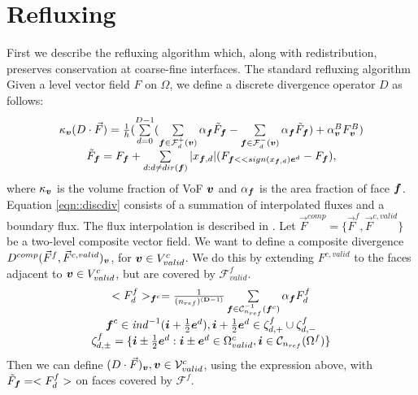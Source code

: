 \section{Refluxing}
\label{sec::reflux}
First we describe the refluxing algorithm which, along with
redistribution, preserves conservation at coarse-fine interfaces.
The standard refluxing algorithm
Given a level vector field $F$ on $\Omega$, we define a discrete
divergence operator $D$ as follows:
\begin{equation}
\begin{array}{c}
\kappa_{\boldsymbol{v}}(D \cdot \vec{F}) = \frac{1}{h}(
\sum\limits^{D-1}_{d=0} (
\sum\limits_{{\boldsymbol{f}} \in {\cal F}^+_d({\boldsymbol{v}})} \alpha_{\boldsymbol{f}} \tilde{F}_{\boldsymbol{f}}-
\sum\limits_{{\boldsymbol{f}} \in {\cal F}^-_d({\boldsymbol{v}})} \alpha_{\boldsymbol{f}} \tilde{F}_{\boldsymbol{f}})
 + \alpha^B_{\boldsymbol{v}} F^B_{\boldsymbol{v}}) \\ 
\tilde{F}_{\boldsymbol{f}} = F_{\boldsymbol{f}} + \sum\limits_{d:d \neq dir({\boldsymbol{f}})}|x_{{\boldsymbol{f}},
d}|(F_{{\boldsymbol{f}}<<sign(x_{{\boldsymbol{f}}, d}){\boldsymbol{e}}^d}-F_{\boldsymbol{f}}),
\end{array}
\label{eqn::discdiv}
\end{equation}
where $\kappa_{\boldsymbol{v}}$ is the volume fraction of VoF ${\boldsymbol{v}}$
and $\alpha_{\boldsymbol{f}}$ is the area fraction of face ${\boldsymbol{f}}$.
Equation \ref{eqn::discdiv}  consists of a summation of interpolated
fluxes and a boundary flux.  The flux interpolation is described
in \cite{JohansenColella1998}.
Let $\vec{F}^{comp} = \{ \vec{F}^f, \vec{F}^{c, valid} \}$ be a
two-level composite vector field. We want to define a composite
divergence $D^{comp}(\vec{F}^f, \vec{F}^{c, valid})_{\boldsymbol{v}}$, for
${\boldsymbol{v}} \in V^c_{valid}$. We do this by extending $F^{c, valid}$ to
the faces adjacent to ${\boldsymbol{v}} \in V^c_{valid}$, but are covered by
$\mathcal{F}^f_{valid}$. 
\begin{equation}
\begin{array}{c}
<F^f_d>_{{\boldsymbol{f}}^c} = \frac{1}{(n_{ref})^{({\mathbf{D}}-1)}}
\sum\limits_{{\boldsymbol{f}} \in \mathcal{C}^{-1}_{n_{ref}}
({\boldsymbol{f}}^c)}\alpha_{\boldsymbol{f}} F^f_d \\ 
{\boldsymbol{f}}^c \in {\it ind}^{-1}({\boldsymbol{i}} + \frac{1}{2} {\boldsymbol{e}}^d), {\boldsymbol{i}} + \frac{1}{2}
{\boldsymbol{e}}^d \in \zeta^f_{d, +} \cup \zeta^f_{d, -} \\ 
\zeta^f_{d, \pm} = \{ {\boldsymbol{i}} \pm \frac{1}{2} {\boldsymbol{e}}^d : {\boldsymbol{i}} \pm {\boldsymbol{e}}^d
\in \Omega^c_{valid}, {\boldsymbol{i}} \in \mathcal{C}_{n_{ref}}(\Omega^f) \} 
\end{array}
\end{equation}
Then we can define $(D \cdot \vec{F})_{\boldsymbol{v}}, {\boldsymbol{v}} \in
\mathcal{V}^c_{valid}$, using the expression above, with
$\tilde{F}_{\boldsymbol{f}} = <F^f_d>$ on faces covered by $\mathcal{F}^f$. 
